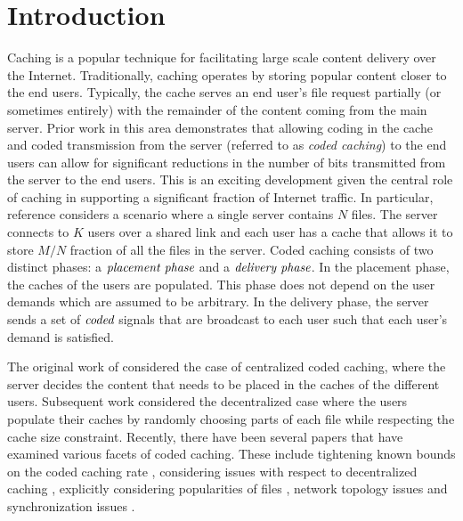 \documentclass[journal,twocolumn]{IEEEtran}
\theoremstyle{definition}
\newcommand{\aditya}[1]{\marginpar{+}{\bf Aditya's remark}: {\em #1}}
\begin{document}
\section{Introduction}
\label{sec:intro}

Caching is a popular technique for facilitating large scale content delivery over the Internet. Traditionally, caching operates by storing popular content closer to the end users. Typically, the cache serves an end user's file request partially (or sometimes entirely) with the remainder of the content coming from the main server. Prior work in this area \cite{maddahN14} demonstrates that allowing coding in the cache and coded transmission from the server (referred to as {\it coded caching}) to the end users can allow for significant reductions in the number of bits transmitted from the server to the end users. This is an exciting development given the central role of caching in supporting a significant fraction of Internet traffic. In particular, reference \cite{maddahN14} considers a scenario where a single server contains $N$ files. %
The server connects to $K$ users over a shared link and each user has a cache that allows it to store $M/N$ fraction of all the files in the server. Coded caching consists of two distinct phases: a $\emph{placement phase}$ and a $\emph{delivery phase}$. In the placement phase, the caches of the users are populated. This phase does not depend on the user demands which are assumed to be arbitrary. In the delivery phase, the server sends a set of $\emph{coded}$ signals that are broadcast to each user such that each user's demand is satisfied.

The original work of \cite{maddahN14} considered the case of centralized coded caching, where the server decides the content that needs to be placed in the caches of the different users. Subsequent work considered the decentralized case where the users populate their caches by randomly choosing parts of each file while respecting the cache size constraint. Recently, there have been several papers that have examined various facets of coded caching. These include tightening known bounds on the coded caching rate \cite{ghasemiR17_accepted,sengupta2015improved}, considering
 issues with respect to decentralized caching \cite{maddahN14mr_tradeoff}, explicitly considering popularities of files \cite{maddahN14nonuniform_demand,hachemKD14a}, network topology issues \cite{TangR16,JJ15} and synchronization issues \cite{ghasemiR17,niesen2015coded}. %
\end{document}
